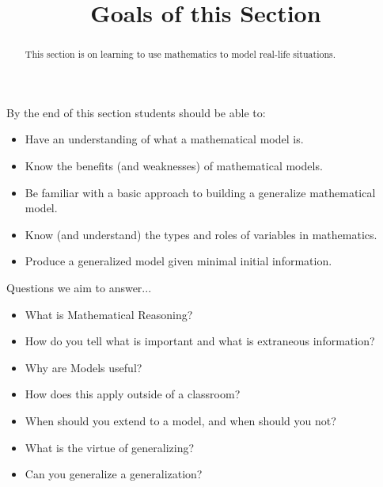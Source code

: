 \documentclass{ximeraXloud}
\title{Goals of this Section}
\begin{document}
\begin{abstract}
    This section is on learning to use mathematics to model real-life situations.
\end{abstract}
\maketitle
By the end of this section students should be able to:

\begin{itemize}
    \item Have an understanding of what a mathematical model is.
    \item Know the benefits (and weaknesses) of mathematical models.
    \item Be familiar with a basic approach to building a generalize mathematical model.
    \item Know (and understand) the types and roles of variables in mathematics.
    \item Produce a generalized model given minimal initial information.
\end{itemize}

Questions we aim to answer...

\begin{itemize}
    \item What is Mathematical Reasoning?
    \item How do you tell what is important and what is extraneous information?
    \item Why are Models useful?
    \item How does this apply outside of a classroom?
    \item When should you extend to a model, and when should you not?
    \item What is the virtue of generalizing?
    \item Can you generalize a generalization?
\end{itemize}
\end{document}
